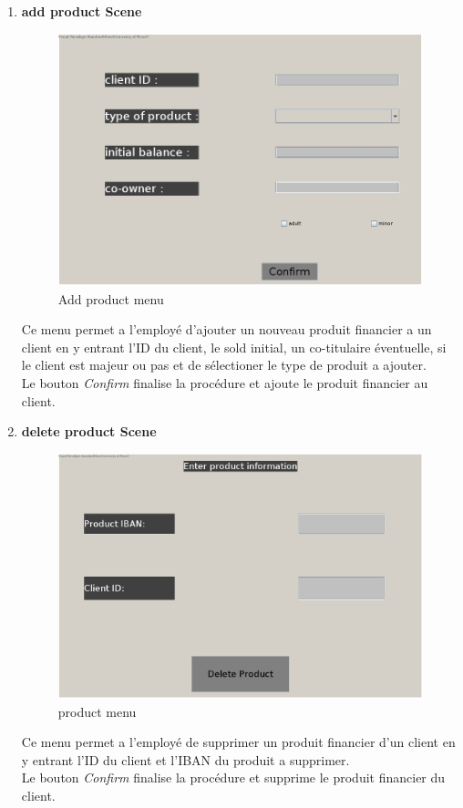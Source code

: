 \documentclass[../rapport.tex]{subfiles}
\begin{document}
\begin{enumerate}
\item \textbf{add product Scene} \\
		\begin{figure}[h!]
				\centering \includegraphics[scale=0.2]{ressources/photos_diagrammes/app2/gui/addFinancialProductMenu.jpg}
				\caption{Add product menu}
		\end{figure}
Ce menu permet a l'employé d'ajouter un nouveau produit financier a un client en y entrant l'ID du client, le sold initial, un co-titulaire éventuelle, si le client est majeur ou pas et de sélectioner le type de produit a ajouter.\\
Le bouton \textit{Confirm} finalise la procédure et ajoute le produit financier au client.\\

\newpage

\item \textbf{delete product Scene} \\
		\begin{figure}[h!]
				\centering \includegraphics[scale=0.2]{ressources/photos_diagrammes/app2/gui/deleteMenu.jpg}
				\caption{ product menu}
		\end{figure}
Ce menu permet a l'employé de supprimer un produit financier d'un client en y entrant l'ID du client et l'IBAN du produit a supprimer.\\
Le bouton \textit{Confirm} finalise la procédure et supprime le produit financier du client.\\


\end{enumerate}
\end{document}

